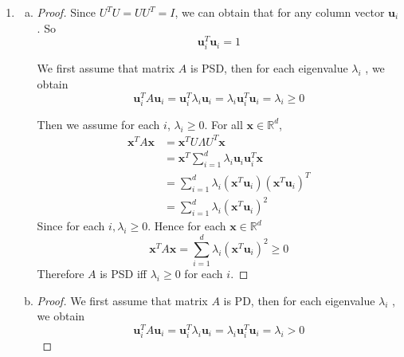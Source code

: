 \documentclass[12pt]{article}
\newcommand{\R}{\mathbb{R}}
\renewcommand{\vec}[1]{\mathbf{#1}}
\begin{document}
\begin{enumerate}[1)]
\begin{enumerate}[(a)]
\begin{enumerate}[(i)]
           	\begin{proof} We can obtain that
            	$$P(H=h) = \sum_{d}P(H=h,D=d)$$
                For any $d, P(H=h, D=d) \geq 0$,
                
                Therefore $P(H=h) = \sum_{d}P(H=h,D=d) \geq P(H=h,D=d)$.
            \end{proof}
            \item It depends. 
            
            Since $P(H=h|D=d) = \frac{P(H=h, D=d)}{P(D=d)}$ and we can't decide the value of $P(D=d) \in (0, 1) $, it depends.
           	\item       		$P(H=h|D=d) \geq P(D=d|H=h)P(H=h)$,
                    \begin{proof}
            $$ P(H=h|D=d) = \frac{P(H=h, D=d)}{P(D=d)} $$
            Therefore $$ P(D=d|H=h)P(H=h) = P(H=h, D=d) \leq P(H=h|D=d)$$
  			\end{proof}
        \end{enumerate}
    \end{enumerate}
    \item
    \begin{enumerate}[(a)]
    	\item 
        \begin{proof}        	Since $U^{T}U = UU^{T} = I$, we can obtain that for any column vector $\mathbf{u}_{i}$. So$$\vec{u}_{i}^{T}\vec{u}_{i} = 1$$
            
            We first assume that matrix $A$ is PSD, then for each eigenvalue $\lambda_{i}$ , we obtain
            $$\vec{u}_{i}^{T}A\vec{u}_{i} = \vec{u}_{i}^{T}\lambda_{i}\vec{u}_{i} = \lambda_{i}\vec{u}_{i}^{T}\vec{u}_{i}  = \lambda_{i} \geq 0$$
                   
            Then we assume for each $i$, $\lambda_{i} \geq 0$. For all $\vec{x} \in \R^{d}$,
            \begin{align*}
           \vec{x}^{T}A\vec{x} & = \vec{x}^{T}U\Lambda U^{T} \vec{x}\\
           & = \vec{x}^{T}\sum_{i=1}^{d}\lambda_{i}\vec{u}_{i}\vec{u}_{i}^{T}\vec{x} \\
           &=  \sum_{i=1}^{d}\lambda_{i}(\vec{x}^{T}\vec{u}_{i})(\vec{x}^{T}\vec{u}_{i})^{T} \\
           & = \sum_{i=1}^{d}\lambda_{i}(\vec{x}^{T}\vec{u}_{i})^{2}
           \end{align*}
           Since for each $i, \lambda_{i} \geq 0$.  Hence for each $\vec{x} \in \R^{d}$
           $$\vec{x}^{T}A\vec{x}  = \sum_{i=1}^{d}\lambda_{i}(\vec{x}^{T}\vec{u}_{i})^{2}\geq 0$$
           Therefore $A$ is PSD iff $\lambda_{i} \geq 0$ for each $i$.
        \end{proof}
        \item
        \begin{proof}
        	We first assume that matrix $A$ is PD, then for each eigenvalue $\lambda_{i}$ , we obtain
            $$\vec{u}_{i}^{T}A\vec{u}_{i} = \vec{u}_{i}^{T}\lambda_{i}\vec{u}_{i} = \lambda_{i}\vec{u}_{i}^{T}\vec{u}_{i}  = \lambda_{i} > 0$$
             

\end{proof}
\end{enumerate}
\end{enumerate}
\end{document}
